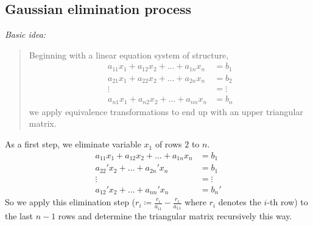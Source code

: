 \documentclass[a4paper]{article}
\numberwithin{lecref}{section}
\theoremstyle{break}
\begin{document}
\subsection{Gaussian elimination process} %

\emph{Basic idea:}
\begin{quote}
  Beginning with a linear equation system of structure,
  \begin{align}
    a_{11} x_1 + a_{12} x_2 + \dots + a_{1n} x_n &= b_1 \nonumber\\
    a_{21} x_1 + a_{22} x_2 + \dots + a_{2n} x_n &= b_2 \nonumber\\
    \vdots &= \vdots \nonumber\\
    a_{n1} x_1 + a_{n2} x_2 + \dots + a_{nn} x_n &= b_n
    \label{eq1}
  \end{align}
  we apply equivalence transformations to end up with an upper triangular matrix.
\end{quote}

As a first step, we eliminate variable $x_1$ of rows $2$ to $n$.
\begin{align}
  a_{11} x_1 + a_{12} x_2 + \dots + a_{1n} x_n &= b_1 \nonumber\\
    a_{22}' x_2 + \dots + a_{2n}' x_n &= b_1 \nonumber\\
      \vdots &= \vdots \nonumber\\
      a_{12}' x_2 + \dots + a_{nn}' x_n &= b_n'
  \label{eq2}
\end{align}
So we apply this elimination step ($r_i \coloneqq \frac{r_i}{a_{i1}} - \frac{r_1}{a_{11}}$ where $r_i$ denotes the $i$-th row) to the last $n-1$ rows and determine the triangular matrix recursively this way.
\end{document}
